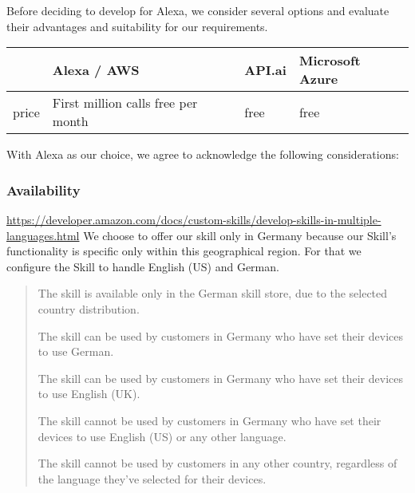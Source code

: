 

Before deciding to develop for Alexa, we consider several options and evaluate their advantages and suitability for our requirements.


\begin{table}
	\begin{tabularx}{\linewidth}{r | l l l}
		& Alexa / AWS & API.ai & Microsoft Azure \\ \hline
		price & First million calls free per month & free & free \\
	\end{tabularx}
\end{table}

With Alexa as our choice, we agree to acknowledge the following considerations:




\subsubsection*{Availability}
\url{https://developer.amazon.com/docs/custom-skills/develop-skills-in-multiple-languages.html}
We choose to offer our skill only in Germany because our Skill's functionality is specific only within this geographical region. For that we configure the Skill to handle English (US) and German.

\begin{quotation}
	
	\item The skill is available only in the German skill store, due to the selected country distribution.
	\item The skill can be used by customers in Germany who have set their devices to use German.
	\item The skill can be used by customers in Germany who have set their devices to use English (UK).
	\item The skill cannot be used by customers in Germany who have set their devices to use English (US) or any other language.
	\item The skill cannot be used by customers in any other country, regardless of the language they've selected for their devices.
	
\end{quotation}


